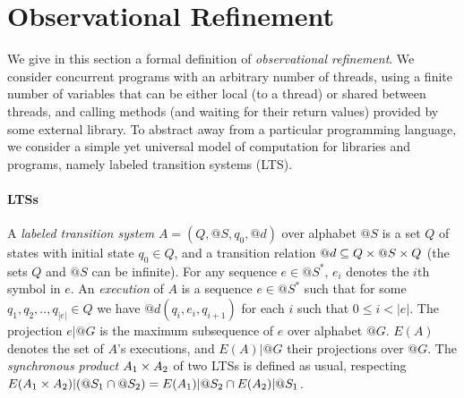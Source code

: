 \section{Observational Refinement}
\label{sec:refinement}

We give in this section a formal definition of  \emph{observational refinement}. 
We consider concurrent programs with an arbitrary number of threads, using a 
finite number of variables that can be either local (to a thread) or shared between 
threads, and calling methods (and waiting for their return values) provided 
by some external library.
To abstract away from a particular programming language, we consider 
a simple yet universal model of computation for libraries and programs, namely labeled
transition systems (LTS). 

\paragraph{LTSs}
A \emph{labeled transition system} $A = (Q,@S,q_0,@d)$ over alphabet $@S$ is a
set $Q$ of states with initial state $q_0 \in Q$, and a transition relation $@d
\subseteq Q \times @S \times Q$ (the sets $Q$ and $@S$ can be infinite). 
For any sequence $e \in @S^*$, $e_i$ denotes the $i$th symbol in $e$.
An \emph{execution} of $A$ is a sequence $e \in @S^*$ such
that for some $q_1, q_2, .., q_{|e|} \in Q$ we have $@d(q_i,e_i,q_{i+1})$ for
each $i$ such that $0 \le i < |e|$. The projection $e|@G$ is the maximum subsequence of $e$
over alphabet $@G$. $E(A)$ denotes the set of $A$'s executions, and $E(A)|@G$
their projections over $@G$. The \emph{synchronous product} $A_1 \times A_2$ of two
LTSs is defined as usual, respecting $E(A_1 \times A_2)|(@S_1 \cap @S_2) =
E(A_1)|@S_2 \cap E(A_2)|@S_1$.

%
%  
%

